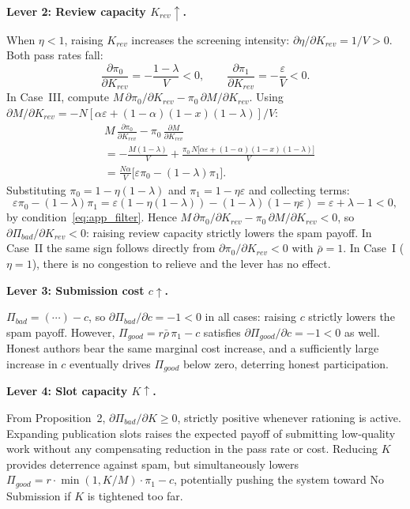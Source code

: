 \documentclass{article}
\begin{document}
\medskip\noindent\textbf{Lever 2: Review capacity $K_{\mathit{rev}}\uparrow$.}

When $\eta < 1$, raising $K_{\mathit{rev}}$ increases the screening intensity: $\partial\eta/\partial K_{\mathit{rev}} = 1/V > 0$.
Both pass rates fall:
\[
  \frac{\partial\pi_0}{\partial K_{\mathit{rev}}} = -\frac{1-\lambda}{V} < 0,
  \qquad
  \frac{\partial\pi_1}{\partial K_{\mathit{rev}}} = -\frac{\varepsilon}{V} < 0.
\]
In Case~III, compute $M\,\partial\pi_0/\partial K_{\mathit{rev}} - \pi_0\,\partial M/\partial K_{\mathit{rev}}$.
Using $\partial M/\partial K_{\mathit{rev}} = -N[\alpha\varepsilon + (1-\alpha)(1-x)(1-\lambda)]/V$:
\begin{align*}
  &M\,\frac{\partial\pi_0}{\partial K_{\mathit{rev}}} - \pi_0\,\frac{\partial M}{\partial K_{\mathit{rev}}} \\
  &= -\frac{M(1-\lambda)}{V}
     + \frac{\pi_0\,N\bigl[\alpha\varepsilon+(1-\alpha)(1-x)(1-\lambda)\bigr]}{V} \\
  &= \frac{N\alpha}{V}\bigl[\varepsilon\pi_0 - (1-\lambda)\pi_1\bigr].
\end{align*}
Substituting $\pi_0 = 1-\eta(1-\lambda)$ and $\pi_1 = 1-\eta\varepsilon$ and collecting terms:
\[
  \varepsilon\pi_0 - (1-\lambda)\pi_1
  = \varepsilon(1-\eta(1-\lambda)) - (1-\lambda)(1-\eta\varepsilon)
  = \varepsilon + \lambda - 1 < 0,
\]
by condition~\eqref{eq:app_filter}.
Hence $M\,\partial\pi_0/\partial K_{\mathit{rev}} - \pi_0\,\partial M/\partial K_{\mathit{rev}} < 0$, so $\partial\Pi_{\mathit{bad}}/\partial K_{\mathit{rev}} < 0$: raising review capacity strictly lowers the spam payoff.
In Case~II the same sign follows directly from $\partial\pi_0/\partial K_{\mathit{rev}} < 0$ with $\bar\rho=1$.
In Case~I ($\eta=1$), there is no congestion to relieve and the lever has no effect.

\medskip\noindent\textbf{Lever 3: Submission cost $c\uparrow$.}

$\Pi_{\mathit{bad}} = (\cdots) - c$, so $\partial\Pi_{\mathit{bad}}/\partial c = -1 < 0$ in all cases: raising $c$ strictly lowers the spam payoff.
However, $\Pi_{\mathit{good}} = r\bar\rho\,\pi_1 - c$ satisfies $\partial\Pi_{\mathit{good}}/\partial c = -1 < 0$ as well.
Honest authors bear the same marginal cost increase, and a sufficiently large increase in $c$ eventually drives $\Pi_{\mathit{good}}$ below zero, deterring honest participation.

\medskip\noindent\textbf{Lever 4: Slot capacity $K\uparrow$.}

From Proposition~2, $\partial\Pi_{\mathit{bad}}/\partial K \geq 0$, strictly positive whenever rationing is active.
Expanding publication slots raises the expected payoff of submitting low-quality work without any compensating reduction in the pass rate or cost.
Reducing $K$ provides deterrence against spam, but simultaneously lowers $\Pi_{\mathit{good}} = r\cdot\min(1,K/M)\cdot\pi_1 - c$, potentially pushing the system toward No Submission if $K$ is tightened too far.
\end{document}
